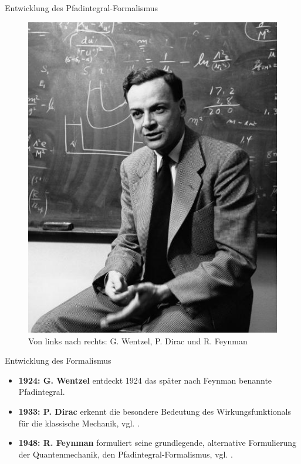 \begin{frame}{Entwicklung des Pfadintegral-Formalismus}
\begin{figure}[H]
\begin{minipage}{0.335\textwidth}
	\includegraphics[width = \textwidth]{figures/feynman}	
	\end{minipage}
	
	\caption{Von links nach rechts: G. Wentzel, P. Dirac und R. Feynman}
\end{figure}
\end{frame}

\begin{frame}{Entwicklung des Formalismus}
	\begin{itemize}
		\item \textbf{1924: G. Wentzel} entdeckt 1924 das später nach Feynman benannte Pfadintegral. 
		\vfill 
		\item \textbf{1933: P. Dirac} erkennt die besondere Bedeutung des Wirkungsfunktionals für die klassische Mechanik, vgl. \cite{Dirac1934}.
		 \vfill 
		 \item \textbf{1948: R. Feynman} formuliert seine grundlegende, alternative Formulierung der Quantenmechanik, den Pfadintegral-Formalismus, vgl. \cite{Feynman1948}.
	\end{itemize}
\end{frame}